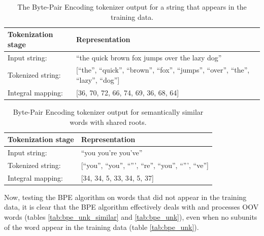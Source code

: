 \documentclass[12pt]{article}
\begin{document}
\begin{table}[h!]
    \centering
    \begin{tabular}{l l}
        \toprule
        Tokenization stage & Representation                                                                            \\
        \midrule
        Input string:      & ``the quick brown fox jumps over the lazy dog''                                           \\
        Tokenized string:  & [``the'', ``quick'', ``brown'', ``fox'', ``jumps'', ``over'', ``the'', ``lazy'', ``dog''] \\
        Integral mapping:  & [36, 70, 72, 66, 74, 69, 36, 68, 64]                                                      \\
        \bottomrule
    \end{tabular}
    \caption{The Byte-Pair Encoding tokenizer output for a string that appears in the training data.}
    \label{tab:bpe_tokenization_example}
\end{table}

\begin{table}[h!]
    \centering
    \begin{tabular}{l l}
        \toprule
        Tokenization stage & Representation                                            \\
        \midrule
        Input string:      & ``you you're you've''                                     \\
        Tokenized string:  & [``you'', ``you'', ``''', ``re'', ``you'', ``''', ``ve''] \\
        Integral mapping:  & [34, 34, 5, 33, 34, 5, 37]                                \\
        \bottomrule
    \end{tabular}
    \caption{Byte-Pair Encoding tokenizer output for semantically similar words with shared roots.}
    \label{tab:bpe_shared_roots_example}
\end{table}

\noindent
Now, testing the BPE algorithm on words that did not appear in the training data, it is clear that the BPE algorithm effectively deals with and
processes OOV words (tables \ref{tab:bpe_unk_similar} and \ref{tab:bpe_unk}), even when no subunits of the word appear in the training data (table
\ref{tab:bpe_unk}).
\end{document}
